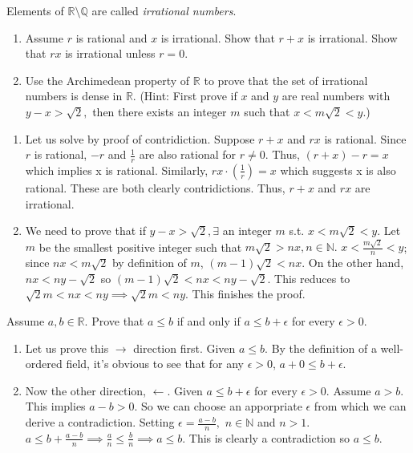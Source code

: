 \documentclass[12pt,letterpaper,boxed]{hmcpset}
\begin{document}
\begin{problem}[Exercise 4.6.]
Elements of $\mathbb{R}\setminus\mathbb{Q}$ are called \textit{irrational numbers}.
\begin{enumerate}
	\itemsep0em
	\item Assume $r$ is rational and $x$ is irrational. Show that $r + x$ is irrational. Show that $rx$ is irrational unless $r=0$.
	\item Use the Archimedean property of $\mathbb{R}$ to prove that the set of irrational numbers is dense in $\mathbb{R}.$ (Hint: First prove if $x$ and $y$ are real numbers with $y - x > \sqrt{2},$ then there exists an integer $m$ such that $x < m\sqrt{2} < y$.)
\end{enumerate}
\end{problem}

\begin{solution}
\begin{enumerate}
	\itemsep0em
	\item Let us solve by proof of contridiction. Suppose $r + x$ and $rx$ is rational. Since $r$ is rational, $-r$ and \(\frac{1}{r}\) are also rational for $r \neq 0$. Thus, $(r + x) - r = x$ which implies x is rational. 
	Similarly, $rx \cdot (\frac{1}{r}) = x$ which suggests x is also rational. These are both clearly contridictions. Thus, $r + x$ and $rx$ are irrational.
	\item We need to prove that if $y - x > \sqrt{2}, \exists$ an integer $m$ s.t. $x < m\sqrt{2} < y.$ Let $m$ be the smallest positive integer such that $m\sqrt{2} > nx, n\in\mathbb{N}.$ $x < \frac{m\sqrt{2}}{n} < y$; since $nx<m\sqrt{2}$ by definition of $m$, $(m - 1)\sqrt{2} < nx.$ On the other hand, $nx < ny - \sqrt{2}$ so $(m-1)\sqrt{2} < nx < ny - \sqrt{2}.$ This reduces to $\sqrt{2}m < nx < ny \implies \sqrt{2}m < ny.$ This finishes the proof. 
\end{enumerate}
\end{solution}

\begin{problem}[Exercise 4.8.]
Assume $a, b \in \mathbb{R}.$ Prove that $a \leq b$ if and only if $a \leq b + \epsilon$ for every $\epsilon > 0.$
\end{problem}

\begin{solution}
\begin{enumerate}
		\itemsep0em
		\item Let us prove this $\rightarrow$ direction first. Given $a \leq b.$ By the definition of a well-ordered field, it's obvious to see that for any $\epsilon > 0$, $a + 0 \leq b + \epsilon$.
		\item Now the other direction, $\leftarrow$. Given $a \leq b + \epsilon$ for every $\epsilon > 0.$ Assume $a > b$. This implies $a - b > 0$. So we can choose an apporpriate $\epsilon$ from which we can derive a contradiction. Setting $\epsilon=\frac{a - b}{n},$ $n\in \mathbb{N}$ and $n > 1$. $a \leq b + \frac{a - b}{n} \implies \frac{a}{n} \leq \frac{b}{n} \implies a \leq b$. This is clearly a contradiction so $a \leq b$.
\end{enumerate}	
\end{solution}
\end{document}
